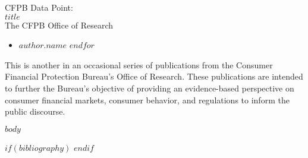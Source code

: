 \documentclass[12pt,letterpaper,twoside]{article}
\begin{document}
\begin{titlepage}
  \thispagestyle{fancy}
  \vspace*{1.5in}
  {\color{white}  \fontsize{38}{38} \selectfont CFPB Data Point:\\[25pt]
  $title$\\[40pt]
  \fontsize{14}{14} \selectfont The CFPB Office of Research\par}
\end{titlepage}

\fancyfoot[R]{}
\begin{itemize}     %
 \renewcommand{\labelitemi}{\scriptsize\FilledSmallSquare}
  $for(author)$
    \item $author.name$
  $endfor$
\end{itemize}

This is another in an occasional series of publications from the Consumer Financial Protection Bureau's Office of Research. These publications are intended to further the Bureau's objective of providing an evidence-based perspective on consumer financial markets, consumer behavior, and regulations to inform the public discourse.
\newpage

\vspace*{1.5in}
\tableofcontents
\thispagestyle{fancy}

\newpage


$body$

$if(bibliography)$
\newpage
\printbibliography[heading=bibintoc,title={References}]
$endif$

%

\end{document}
